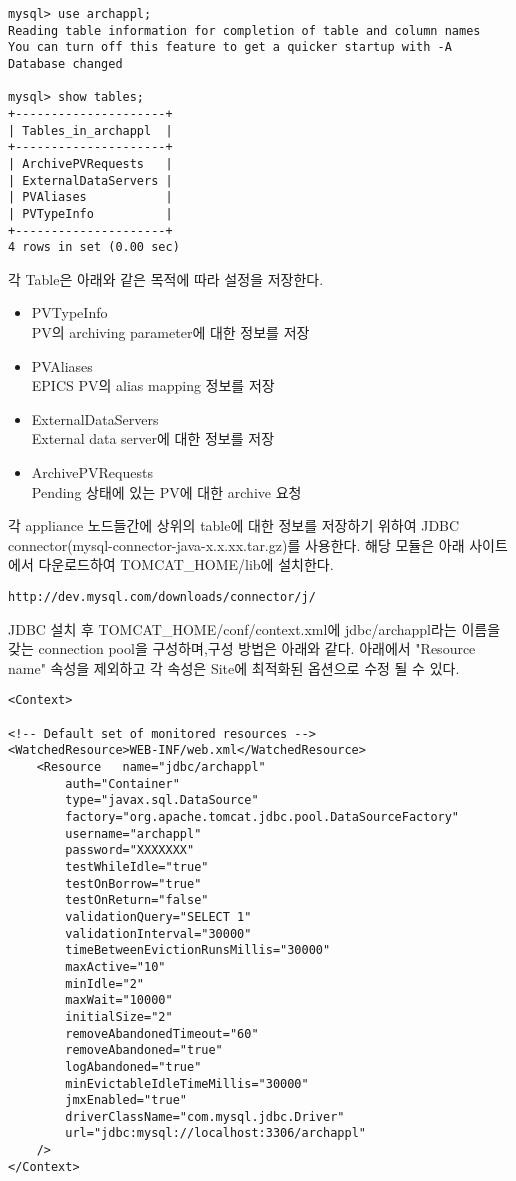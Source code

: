 \documentclass[11pt
  , a4paper
  , article
  , oneside
]{memoir}
\begin{document}
\begin{lstlisting}[style=termstyle]
mysql> use archappl;
Reading table information for completion of table and column names
You can turn off this feature to get a quicker startup with -A
Database changed

mysql> show tables;
+---------------------+
| Tables_in_archappl  |
+---------------------+
| ArchivePVRequests   |
| ExternalDataServers |
| PVAliases           |
| PVTypeInfo          |
+---------------------+
4 rows in set (0.00 sec)
\end{lstlisting}
각 Table은 아래와 같은 목적에 따라 설정을 저장한다.
\begin{itemize}
	\item PVTypeInfo \\
	PV의 archiving parameter에 대한 정보를 저장
	\item PVAliases \\
	EPICS PV의 alias mapping 정보를 저장
	\item ExternalDataServers \\
	External data server에 대한 정보를 저장
	\item ArchivePVRequests \\
	Pending 상태에 있는 PV에 대한 archive 요청
\end{itemize}

각 appliance 노드들간에 상위의 table에 대한 정보를 저장하기 위하여 JDBC connector(mysql-connector-java-x.x.xx.tar.gz)를 사용한다. 해당 모듈은 
아래 사이트에서 다운로드하여 TOMCAT\_HOME/lib에 설치한다. 

\begin{lstlisting}[style=termstyle]
http://dev.mysql.com/downloads/connector/j/
\end{lstlisting}

JDBC 설치 후 TOMCAT\_HOME/conf/context.xml에 jdbc/archappl라는 이름을 갖는 connection pool을 구성하며,구성 방법은 아래와 같다. 아래에서 "Resource name" 속성을 제외하고 각 속성은 Site에 최적화된 옵션으로 수정 될 수 있다.

\begin{lstlisting}[style=termstyle]
<Context>

<!-- Default set of monitored resources -->
<WatchedResource>WEB-INF/web.xml</WatchedResource>
	<Resource   name="jdbc/archappl"
		auth="Container"
		type="javax.sql.DataSource"
		factory="org.apache.tomcat.jdbc.pool.DataSourceFactory"
		username="archappl"
		password="XXXXXXX" 
		testWhileIdle="true"
		testOnBorrow="true"
		testOnReturn="false"
		validationQuery="SELECT 1"
		validationInterval="30000"
		timeBetweenEvictionRunsMillis="30000"
		maxActive="10" 
		minIdle="2" 
		maxWait="10000" 
		initialSize="2"
		removeAbandonedTimeout="60"
		removeAbandoned="true"
		logAbandoned="true"
		minEvictableIdleTimeMillis="30000" 
		jmxEnabled="true"
		driverClassName="com.mysql.jdbc.Driver"
		url="jdbc:mysql://localhost:3306/archappl"
	/>
</Context>
\end{lstlisting}
\end{document}
